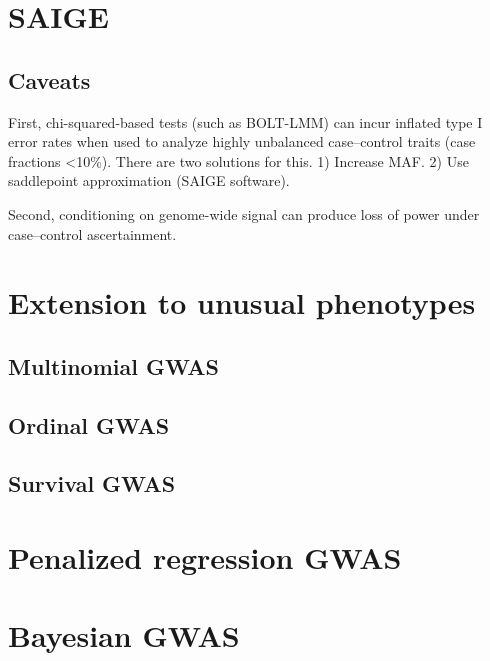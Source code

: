 \documentclass[
]{book}
\begin{document}
\hypertarget{saige}{%
\section{SAIGE}\label{saige}}

\hypertarget{caveats}{%
\subsection{Caveats}\label{caveats}}

First, chi-squared-based tests (such as BOLT-LMM) can incur inflated type I error rates when used to analyze highly unbalanced case--control traits (case fractions \textless10\%). There are two solutions for this.
1) Increase MAF.
2) Use saddlepoint approximation (SAIGE software).

Second, conditioning on genome-wide signal can produce loss of power under case--control ascertainment.

\hypertarget{extension-to-unusual-phenotypes}{%
\section{Extension to unusual phenotypes}\label{extension-to-unusual-phenotypes}}

\hypertarget{multinomial-gwas}{%
\subsection{Multinomial GWAS}\label{multinomial-gwas}}

\hypertarget{ordinal-gwas}{%
\subsection{Ordinal GWAS}\label{ordinal-gwas}}

\hypertarget{survival-gwas}{%
\subsection{Survival GWAS}\label{survival-gwas}}

\hypertarget{penalized-regression-gwas}{%
\section{Penalized regression GWAS}\label{penalized-regression-gwas}}

\hypertarget{bayesian-gwas}{%
\section{Bayesian GWAS}\label{bayesian-gwas}}
\end{document}
